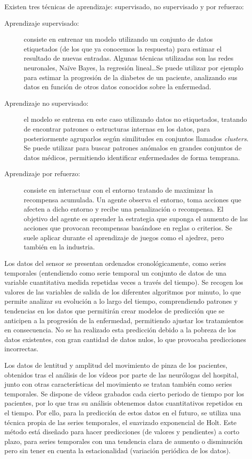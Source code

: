 Existen tres técnicas de aprendizaje: supervisado, no supervisado y por refuerzo:

\begin{description}
    \item[Aprendizaje supervisado:] consiste en entrenar un modelo utilizando un conjunto de datos etiquetados (de los que ya conocemos la respuesta) para estimar el resultado de nuevas entradas. Algunas técnicas utilizadas son las redes neuronales, Naïve Bayes, la regresión lineal\ldots Se puede utilizar por ejemplo para estimar la progresión de la diabetes de un paciente, analizando sus datos en función de otros datos conocidos sobre la enfermedad. 
    
    \item[Aprendizaje no supervisado:] el modelo se entrena en este caso utilizando datos no etiquetados, tratando de encontrar patrones o estructuras internas en los datos, para posteriormente agruparlos según similitudes en conjuntos llamados \textit{clusters}. Se puede utilizar para buscar patrones anómalos en grandes conjuntos de datos médicos, permitiendo identificar enfermedades de forma temprana.
    
    \item[Aprendizaje por refuerzo:] consiste en interactuar con el entorno tratando de maximizar la recompensa acumulada. Un agente observa el entorno, toma acciones que afecten a dicho entorno y recibe una penalización o recompensa. El objetivo del agente es aprender la estrategia que suponga el aumento de las acciones que provocan recompensas basándose en reglas o criterios. Se suele aplicar durante el aprendizaje de juegos como el ajedrez, pero también en la industria.
\end{description}


Los datos del sensor se presentan ordenados cronológicamente, como series temporales (entendiendo como serie temporal un conjunto de datos de una variable cuantitativa medida repetidas veces a través del tiempo). Se recogen los valores de las variables de salida de los diferentes algoritmos por minuto, lo que permite analizar su evolución a lo largo del tiempo, comprendiendo patrones y tendencias en los datos que permitirán crear modelos de predicción que se anticipen a la progresión de la enfermedad, permitiendo ajustar los tratamientos en consecuencia. No se ha realizado esta predicción debido a la pobreza de los datos existentes, con gran cantidad de datos nulos, lo que provocaba predicciones incorrectas.

Los datos de lentitud y amplitud del movimiento de pinza de los pacientes, obtenidos tras el análisis de los vídeos por parte de las neurólogas del hospital, junto con otras características del movimiento se tratan también como series temporales. Se dispone de vídeos grabados cada cierto periodo de tiempo por los pacientes, por lo que tras su análisis obtenemos datos cuantitativos repetidos en el tiempo.
Por ello, para la predicción de estos datos en el futuro, se utiliza una técnica propia de las series temporales, el suavizado exponencial de Holt. Este método está diseñado para hacer predicciones (de valores y pendientes) a corto plazo, para series temporales con una tendencia clara de aumento o disminución pero sin tener en cuenta la estacionalidad (variación periódica de los datos).